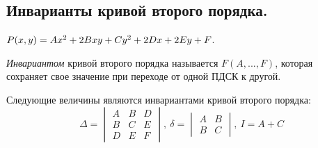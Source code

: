 \subsection{Инварианты кривой второго порядка.}

    $P(x, y) \hm{=} Ax^2 + 2Bxy + Cy^2 + 2Dx + 2Ey + F$.

    \begin{definition}
        \textit{Инвариантом} кривой второго порядка называется $F(A, ..., F)$, которая сохраняет свое значение при переходе от одной ПДСК к другой.
    \end{definition}

    \begin{theorem}
        Следующие величины являются инвариантами кривой второго порядка:
        \[\Delta = \begin{vmatrix}
            A & B & D \\
            B & C & E \\
            D & E & F
        \end{vmatrix}, \ \delta = \begin{vmatrix}
            A & B \\
            B & C
        \end{vmatrix}, \ I = A + C\]
    \end{theorem}

